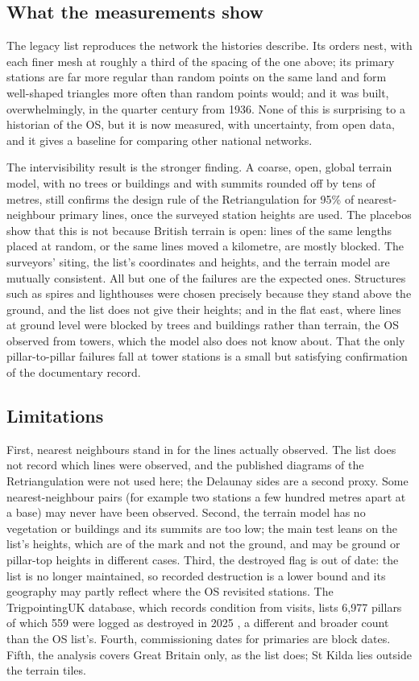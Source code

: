\documentclass[11pt,a4paper]{article}
\begin{document}
\subsection{What the measurements show}
The legacy list reproduces the network the histories describe. Its orders nest, with each finer mesh at roughly a third of the spacing of the one above; its primary stations are far more regular than random points on the same land and form well-shaped triangles more often than random points would; and it was built, overwhelmingly, in the quarter century from 1936. None of this is surprising to a historian of the OS, but it is now measured, with uncertainty, from open data, and it gives a baseline for comparing other national networks.

The intervisibility result is the stronger finding. A coarse, open, global terrain model, with no trees or buildings and with summits rounded off by tens of metres, still confirms the design rule of the Retriangulation for 95\% of nearest-neighbour primary lines, once the surveyed station heights are used. The placebos show that this is not because British terrain is open: lines of the same lengths placed at random, or the same lines moved a kilometre, are mostly blocked. The surveyors' siting, the list's coordinates and heights, and the terrain model are mutually consistent. All but one of the failures are the expected ones. Structures such as spires and lighthouses were chosen precisely because they stand above the ground, and the list does not give their heights; and in the flat east, where lines at ground level were blocked by trees and buildings rather than terrain, the OS observed from towers, which the model also does not know about. That the only pillar-to-pillar failures fall at tower stations is a small but satisfying confirmation of the documentary record.

\subsection{Limitations}
First, nearest neighbours stand in for the lines actually observed. The list does not record which lines were observed, and the published diagrams of the Retriangulation \citep{os1967} were not used here; the Delaunay sides are a second proxy. Some nearest-neighbour pairs (for example two stations a few hundred metres apart at a base) may never have been observed. Second, the terrain model has no vegetation or buildings and its summits are too low; the main test leans on the list's heights, which are of the mark and not the ground, and may be ground or pillar-top heights in different cases. Third, the destroyed flag is out of date: the list is no longer maintained, so recorded destruction is a lower bound and its geography may partly reflect where the OS revisited stations. The TrigpointingUK database, which records condition from visits, lists 6,977 pillars of which 559 were logged as destroyed in 2025 \citep{tukpillar}, a different and broader count than the OS list's. Fourth, commissioning dates for primaries are block dates. Fifth, the analysis covers Great Britain only, as the list does; St Kilda lies outside the terrain tiles.
\end{document}
